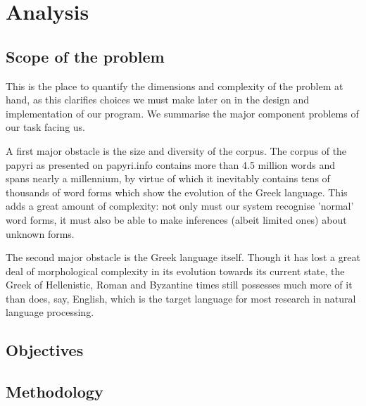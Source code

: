 
\chapter{Analysis}
\label{chp:analysis}

\section{Scope of the problem}

This is the place to quantify the dimensions and complexity of the
problem at hand, as this clarifies choices we must make later on in
the design and implementation of our program. We summarise the major
component problems of our task facing us.

A first major obstacle is the size and diversity of the corpus. The
corpus of the papyri as presented on papyri.info contains more than
4.5 million words and spans nearly a millennium, by virtue of which it
inevitably contains tens of thousands of word forms which show the
evolution of the Greek language. This adds a great amount of
complexity: not only must our system recognise 'normal' word forms, it
must also be able to make inferences (albeit limited ones) about
unknown forms. 

The second major obstacle is the Greek language itself. Though it has
lost a great deal of morphological complexity in its evolution towards
its current state, the Greek of Hellenistic, Roman and Byzantine times
still possesses much more of it than does, say, English, which is the
target language for most research in natural language processing.

\section{Objectives}



\section{Methodology}